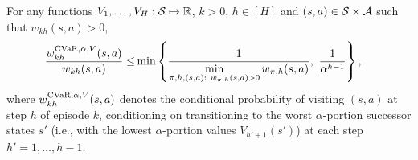 \begin{lemma} \label{lemma:w_cvar_over_w}
	For any functions $V_1,\dots,V_{H}:\mathcal{S} \mapsto \mathbb{R}$, $k>0$, $h \in [H]$ and $(s,a) \in \mathcal{S} \times \mathcal{A}$ such that $w_{kh}(s,a)>0$, 
	\begin{align*}
		\frac{w^{\textup{CVaR},\alpha,V}_{kh}(s,a)}{w_{kh}(s,a)} \leq & \min \left\{  \frac{1}{\min \limits_{\begin{subarray}{c}\pi,h,(s,a):\  w_{\pi,h}(s,a)>0\end{subarray}} w_{\pi,h}(s,a)} ,\  \frac{1}{\alpha^{h-1}}  \right\} ,
	\end{align*}
	where $w^{\textup{CVaR},\alpha,V}_{kh}(s,a)$ denotes the conditional probability of visiting $(s,a)$ at step $h$ of episode $k$, conditioning on transitioning to the worst $\alpha$-portion successor states $s'$ (i.e., with the lowest $\alpha$-portion values $V_{h'+1}(s')$) at each step $h'=1,\dots,h-1$.
\end{lemma}
